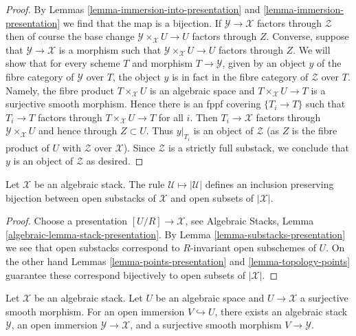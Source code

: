 \begin{proof}
By Lemmas \ref{lemma-immersion-into-presentation} and
\ref{lemma-immersion-presentation}
we find that the map is a bijection.
If $\mathcal{Y} \to \mathcal{X}$ factors through $\mathcal{Z}$
then of course the base change $\mathcal{Y} \times_\mathcal{X} U \to U$
factors through $Z$. Converse, suppose that $\mathcal{Y} \to \mathcal{X}$
is a morphism such that $\mathcal{Y} \times_\mathcal{X} U \to U$
factors through $Z$. We will show that for every scheme $T$ and
morphism $T \to \mathcal{Y}$,
given by an object $y$ of the fibre category of $\mathcal{Y}$ over $T$,
the object $y$ is in fact in the fibre category of $\mathcal{Z}$ over $T$.
Namely, the fibre product $T \times_\mathcal{X} U$ is an algebraic
space and $T \times_\mathcal{X} U \to T$ is a surjective smooth morphism.
Hence there is an fppf covering $\{T_i \to T\}$ such that
$T_i \to T$ factors through $T \times_\mathcal{X} U \to T$ for all $i$.
Then $T_i \to \mathcal{X}$ factors through $\mathcal{Y} \times_\mathcal{X} U$
and hence through $Z \subset U$. Thus $y|_{T_i}$ is an object of
$\mathcal{Z}$ (as $Z$ is the fibre product of $U$ with
$\mathcal{Z}$ over $\mathcal{X}$).
Since $\mathcal{Z}$ is a strictly full substack, we conclude
that $y$ is an object of $\mathcal{Z}$ as desired.
\end{proof}

\begin{lemma}
\label{lemma-open-substacks}
Let $\mathcal{X}$ be an algebraic stack. The rule
$\mathcal{U} \mapsto |\mathcal{U}|$ defines an inclusion preserving
bijection between open substacks of $\mathcal{X}$ and open subsets
of $|\mathcal{X}|$.
\end{lemma}

\begin{proof}
Choose a presentation $[U/R] \to \mathcal{X}$, see
Algebraic Stacks, Lemma \ref{algebraic-lemma-stack-presentation}.
By
Lemma \ref{lemma-substacks-presentation}
we see that open substacks correspond to $R$-invariant open subschemes
of $U$. On the other hand
Lemmas \ref{lemma-points-presentation} and \ref{lemma-topology-points}
guarantee these correspond bijectively to open subsets of $|\mathcal{X}|$.
\end{proof}

\begin{lemma}
\label{lemma-open-image-substack}
Let $\mathcal X$ be an algebraic stack. Let $U$ be an algebraic space and
$U \to \mathcal X$ a surjective smooth morphism. For an open immersion
$V \hookrightarrow U$, there exists an algebraic stack $\mathcal Y$, an
open immersion $\mathcal Y \to \mathcal X$, and a surjective smooth
morphism $V \to \mathcal Y$.
\end{lemma}

